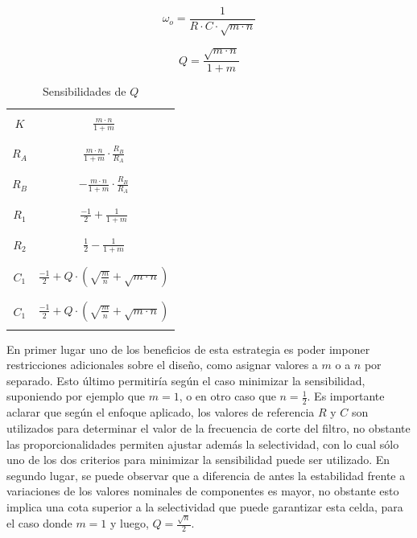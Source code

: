 \begin{equation}
    \omega_o = \frac{1}{R \cdot C \cdot \sqrt{m \cdot n}}
    \label{eq:wo_ajuste_componentes_propocionales}
\end{equation}

\begin{equation}
    Q = \frac{\sqrt{m \cdot n}}{1 + m}
    \label{eq:q_ajuste_componentes_proporcionales}
\end{equation}


\begin{table}[H]
    \centering
    \begin{tabular}{c | c}
        \hline \\
        $K$ & $\frac{m \cdot n}{1 + m}$ \\
        \\ \hline \\
        $R_A$ & $\frac{m \cdot n}{1 + m} \cdot \frac{R_B}{R_A}$ \\
        \\ \hline \\
        $R_B$ & $- \frac{m \cdot n}{1 + m} \cdot \frac{R_B}{R_A}$ \\
        \\ \hline \\
        $R_1$ & $\frac{-1}{2} + \frac{1}{1 + m}$ \\
        \\ \hline \\
        $R_2$ & $\frac{1}{2} - \frac{1}{1 + m}$ \\
        \\ \hline \\
        $C_1$ & $\frac{-1}{2} + Q \cdot \left( \sqrt{\frac{m}{n}} + \sqrt{m \cdot n} \right)$ \\
        \\ \hline \\
        $C_1$ & $\frac{-1}{2} + Q \cdot \left( \sqrt{\frac{m}{n}} + \sqrt{m \cdot n} \right)$ \\
        \\ \hline
    \end{tabular}
    \caption{Sensibilidades de $Q$}
\end{table}

En primer lugar uno de los beneficios de esta estrategia es poder imponer restricciones adicionales sobre el dise\~no, como asignar valores a $m$ o a $n$ por separado. Esto \'ultimo permitir\'ia seg\'un
el caso minimizar la sensibilidad, suponiendo por ejemplo que $m = 1$, o en otro caso que $n = \frac{1}{2}$. Es importante aclarar que seg\'un el enfoque aplicado, los valores de referencia $R$ y $C$ son utilizados
para determinar el valor de la frecuencia de corte del filtro, no obstante las proporcionalidades permiten ajustar adem\'as la selectividad, con lo cual s\'olo uno de los dos criterios para minimizar la sensibilidad puede ser utilizado.
En segundo lugar, se puede observar que a diferencia de antes la estabilidad frente a variaciones de los valores nominales de componentes es mayor, no obstante esto implica una cota superior a la selectividad que puede garantizar esta celda,
para el caso donde $m = 1$ y luego, $Q = \frac{\sqrt{n}}{2}$.


